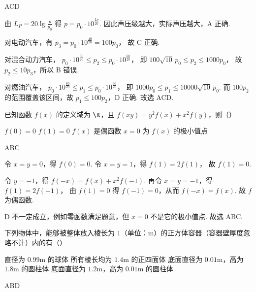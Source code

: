 \begin{answer}
ACD
\end{answer}

\begin{solution}
由
\(L_P=20\lg\frac{p}{p_0}\)
得
\(p=p_0\cdot 10^{\frac{L_P}{20}}\).
因此声压级越大，实际声压越大，A 正确.

对电动汽车，有
\(p_3=p_0\cdot 10^{\frac{40}{20}}=100p_0\)，
故 C 正确.

对混合动力汽车，
\(p_0\cdot 10^{\frac{50}{20}}\le p_2\le p_0\cdot 10^{\frac{60}{20}}\)，
即
\(100\sqrt{10}\,p_0\le p_2\le 1000p_0\)，
故 \(p_2\le 10p_3\)，所以 B 错误.

对燃油汽车，
\(p_0\cdot 10^{\frac{60}{20}}\le p_1\le p_0\cdot 10^{\frac{90}{20}}\)，
即
\(1000p_0\le p_1\le 10000\sqrt{10}\,p_0\).
而 \(100p_2\) 的范围覆盖该区间，故 \(p_1\le 100p_2\)，D 正确. 故选 ACD.
\end{solution}

\begin{problem}
已知函数 \(f(x)\) 的定义域为 \(\R\)，且 \(f(xy)=y^2f(x)+x^2f(y)\)，则（\quad）

\choices
    {\(f(0)=0\)}
    {\(f(1)=0\)}
    {\(f(x)\) 是偶函数}
    {\(x=0\) 为 \(f(x)\) 的极小值点}
\end{problem}

\begin{answer}
ABC
\end{answer}

\begin{solution}
令 \(x=y=0\)，得
\(f(0)=0\).
令 \(x=y=1\)，得
\(f(1)=2f(1)\)，
故 \(f(1)=0\).

令 \(y=-1\)，得
\(f(-x)=f(x)+x^2f(-1)\).
再令 \(x=y=-1\)，得
\(f(1)=2f(-1)\)，
由 \(f(1)=0\) 得 \(f(-1)=0\)，从而
\(f(-x)=f(x)\).
故 \(f\) 为偶函数.

D 不一定成立，例如零函数满足题意，但 \(x=0\) 不是它的极小值点. 故选 ABC.
\end{solution}

\begin{problem}
下列物体中，能够被整体放入棱长为 \(1\)（单位：m）的正方体容器（容器壁厚度忽略不计）内的有（\quad）

\choices
    {直径为 \(0.99\text{m}\) 的球体}
    {所有棱长均为 \(1.4\text{m}\) 的正四面体}
    {底面直径为 \(0.01\text{m}\)，高为 \(1.8\text{m}\) 的圆柱体}
    {底面直径为 \(1.2\text{m}\)，高为 \(0.01\text{m}\) 的圆柱体}
\end{problem}

\begin{answer}
ABD
\end{answer}

